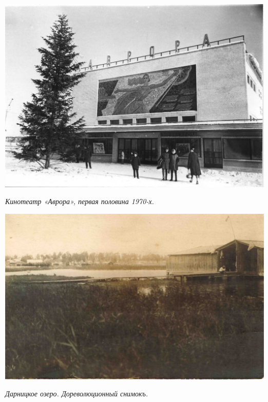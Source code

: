 \begin{center}
\includegraphics[width=\linewidth]{lpix/avrora-1970-75.jpg}

\textit{Кинотеатр «Аврора», первая половина 1970-х.}
\end{center}


\vspace*{\fill}

\newpage

\vspace*{\fill}

\begin{center}
\includegraphics[width=\linewidth]{lpix/darnickoe-ozero-dprev.jpg}

\textit{Дарницкое озеро. Дореволюционный снимокъ.}
\end{center}

